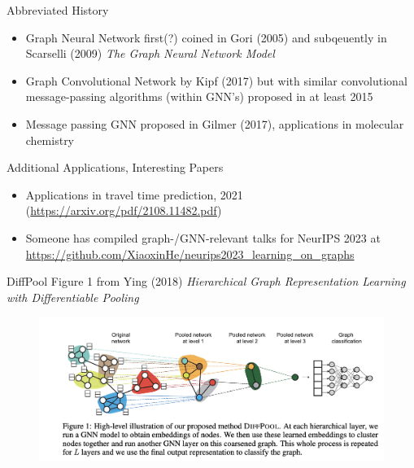 \documentclass{beamer}
\begin{document}
\begin{frame}{Abbreviated History}
    \begin{itemize}
        \item Graph Neural Network first(?) coined in Gori (2005) \cite{gori_new_2005} and subqeuently in Scarselli (2009) {\it The Graph Neural Network Model} \cite{scarselli_graph_2009}
        \item Graph Convolutional Network by Kipf (2017) \cite{kipf_semi-supervised_2017} but with similar convolutional message-passing algorithms (within GNN's) proposed in at least 2015 \cite{duvenaud_convolutional_2015}
        \item Message passing GNN proposed in Gilmer (2017), applications in molecular chemistry \cite{gilmer_neural_2017} 
    \end{itemize}
\end{frame}

\begin{frame}[allowframebreaks]{Additional Applications, Interesting Papers}
    \begin{itemize}
        \item Applications in travel time prediction, 2021 (\url{https://arxiv.org/pdf/2108.11482.pdf})
        \item Someone has compiled graph-/GNN-relevant talks for NeurIPS 2023 at \url{https://github.com/XiaoxinHe/neurips2023_learning_on_graphs}
    \end{itemize}
\end{frame}

\begin{frame}{DiffPool}
    Figure 1 from Ying (2018) {\it Hierarchical Graph Representation Learning with Differentiable Pooling} \cite{ying_hierarchical_2018}
    \begin{figure}
        \centering 
        \includegraphics[scale=0.45]{DIFFPOOL_RexYing.png}
    \end{figure}
\end{frame}
\end{document}

